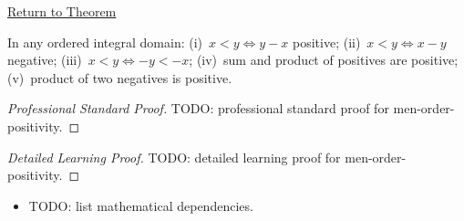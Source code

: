 \newpage
{}
\label{prf:men-order-positivity}

\begin{remark*}[Return]
\hyperref[thm:men-order-positivity]{Return to Theorem}
\end{remark*}

\begin{theorem*}
In any ordered integral domain:
(i)~$x<y \iff y-x$ positive;
(ii)~$x<y \iff x-y$ negative;
(iii)~$x<y \iff -y<-x$;
(iv)~sum and product of positives are positive;
(v)~product of two negatives is positive.
\end{theorem*}

\begin{proof}[Professional Standard Proof]
\LRAProofBodyStart
TODO: professional standard proof for men-order-positivity.
\end{proof}

\begin{proof}[Detailed Learning Proof]
\LRAProofBodyStart
TODO: detailed learning proof for men-order-positivity.
\end{proof}

\begin{remark*}
\end{remark*}

\begin{dependencies}
\begin{itemize}
  \item TODO: list mathematical dependencies.
\end{itemize}
\end{dependencies}

\clearpage
